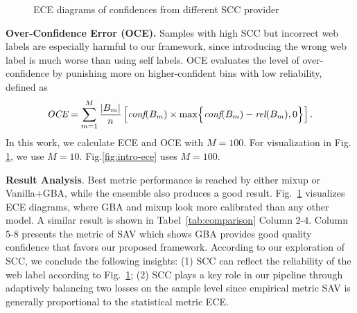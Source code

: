 \documentclass[runningheads]{llncs}
\begin{document}
\begin{figure}[t!]
    \centering
    
    \caption{ECE diagrams of confidences from different SCC provider}
	\label{fig:ece}
\end{figure}
\textbf{Over-Confidence Error (OCE).} Samples with high SCC but incorrect web labels are especially harmful to our framework, since introducing the wrong web label is much worse than using self labels. OCE evaluates the level of over-confidence by punishing more on higher-confident bins with low reliability, defined as
\begin{equation}
\label{E:oce}
\textit{OCE} = \sum_{m=1}^{M}\frac{|B_m|}{n}\left[\textit{conf}(B_m)\times \max\Bigl\{\textit{conf}(B_m)-\textit{rel}(B_m), 0\Bigr\} \right].
\end{equation}
In this work, we calculate ECE and OCE with $M=100$. For visualization in Fig. \ref{fig:ece}, we use $M=10$. Fig.\ref{fig:intro-ece} uses $M=100$.

\textbf{Result Analysis}.
Best metric performance is reached by either mixup or Vanilla+GBA, while the ensemble also produces a good result. Fig.~\ref{fig:ece} visualizes ECE diagrams, where GBA and mixup look more calibrated than any other model. A similar result is shown in Tabel~\ref{tab:comparison} Column $2$-$4$. Column $5$-$8$ presents the metric of SAV which shows GBA provides good quality confidence that favors our proposed framework. According to our exploration of SCC, we conclude the following insights:
(1) SCC can reflect the reliability of the web label according to Fig.~\ref{fig:ece};
(2) SCC plays a key role in our pipeline through adaptively balancing two losses on the sample level since empirical metric SAV is generally proportional to the statistical metric ECE.
    
\end{document}
